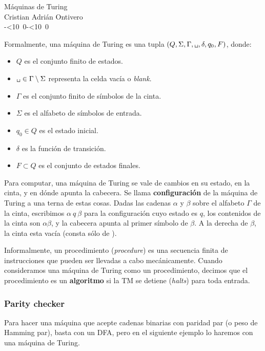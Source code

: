 \documentclass{article}
\newcommand{\blank}{\text{\tt \textvisiblespace}}
\theoremstyle{definition}
\def\isodate{\leavevmode\hbox{\the\year-\twodigits\month-\twodigits\day}}
\def\twodigits#1{\ifnum#1<10 0\fi\the#1}
\begin{document}
\begin{center}
  {\LARGE Máquinas de Turing}\\[.2cm]
  Cristian Adrián Ontivero \\[.05cm]%
  \isodate%
\end{center}

Formalmente, una máquina de Turing es una tupla $(Q, \Sigma, \Gamma, \blank, \delta, q_0, F)$, donde:
\begin{itemize}
  \setlength\itemsep{0pt}
   \item $Q$ es el conjunto finito de estados.
   \item $\blank \in \Gamma \setminus \Sigma$ representa la celda vacía o \textit{blank}.
   \item $\Gamma$ es el conjunto finito de símbolos de la cinta. 
   \item $\Sigma$ es el alfabeto de símbolos de entrada.
   \item $q_0 \in Q$ es el estado inicial.
   \item $\delta$ es la función de transición.
   \item $F \subset Q$ es el conjunto de estados finales.
 \end{itemize}

Para computar, una máquina de Turing se vale de cambios en su estado, en la
cinta, y en dónde apunta la cabecera. Se llama \textbf{configuración} de la
máquina de Turing a una terna de estas cosas. Dadas las cadenas $\alpha$ y
$\beta$ sobre el alfabeto $\Gamma$ de la cinta, escribimos $\alpha~q~\beta$ para
la configuración cuyo estado es $q$, los contenidos de la cinta son
$\alpha\beta$, y la cabecera apunta al primer símbolo de $\beta$. A la derecha
de $\beta$, la cinta esta vacía (consta sólo de \blank).

Informalmente, un procedimiento (\textit{procedure}) es una secuencia finita de
instrucciones que pueden ser llevadas a cabo mecánicamente. Cuando consideramos
una máquina de Turing como un procedimiento, decimos que el procedimiento es un
\textbf{algoritmo} si la TM se detiene (\textit{halts}) para toda entrada. 

\subsubsection*{Parity checker}
Para hacer una máquina que acepte cadenas binarias con paridad par (o peso de
Hamming par), basta con un DFA, pero en el siguiente ejemplo lo haremos con una
máquina de Turing.
\end{document}
